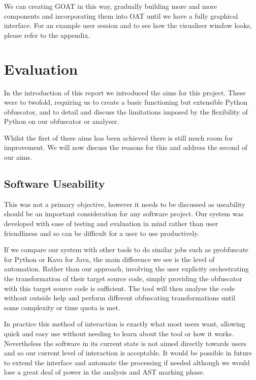 \documentclass[twoside,a4paper]{report}
\begin{document}
We can creating GOAT in this way, gradually building more and more components and incorporating them into OAT until we have a fully graphical interface.
For an example user session and to see how the visualiser window looks, please refer to the appendix.

\section{Evaluation}

In the introduction of this report we introduced the aims for this project. These were to twofold, requiring us to create a basic functioning but extensible
Python obfuscator, and to detail and discuss the limitations imposed by the flexibility of Python on our obfuscator or analyser.

Whilst the first of these aims has been achieved there is still much room for improvement. We will now discuss the reasons for this and address the second
of our aims.

\subsection{Software Useability}

This was not a primary objective, however it needs to be discussed as useability should be an important consideration for any software project. Our system
was developed with ease of testing and evaluation in mind rather than user friendliness and so can be difficult for a user to use productively.

If we compare our system with other tools to do similar jobs such as pyobfuscate \cite{pyobf} for Python or Kava \cite{taxobftrans} for Java, the main
difference we see is the level of automation. Rather than our approach, involving the user explicity orchestrating the transformation of their target
source code, simply providing the obfuscator with this target source code is sufficient. The tool will then analyse the code without outside help
and perform different obfuscating transformations until some complexity or time quota is met.

In practice this method of interaction is exactly what most users want, allowing quick and easy use without needing to learn about the tool or
how it works. Nevertheless the software in its current state is not aimed directly towards users and so our current level of interaction is acceptable.
It would be possible in future to extend the interface and automate the processing if needed although we would lose a great deal of power in the analysis
and AST marking phase.
\end{document}
